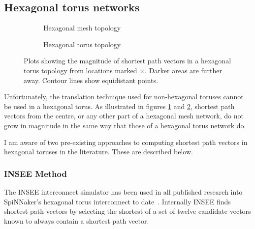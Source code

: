 		\subsection{Hexagonal torus networks}
			
			\begin{figure}
				\center
				
				\begin{subfigure}{\linewidth}
					\center
					\caption{Hexagonal mesh topology}
					\label{fig:distance-map-hex-mesh}
				\end{subfigure}
				
				\vspace{1em}
				
				\begin{subfigure}{\linewidth}
					\center
					\caption{Hexagonal torus topology}
					\label{fig:distance-map-hex-torus}
				\end{subfigure}
				
				\caption[Magnitudes of shortest path vectors in a hexagonal torus.]%
				{Plots showing the magnitude of shortest path vectors in a hexagonal
				torus topology from locations marked {\color{red}$\times$}.  Darker
				areas are further away. Contour lines show equidistant points.}
				
				\label{fig:distance-map-hex}
			\end{figure}
			
			Unfortunately, the translation technique used for non-hexagonal toruses
			cannot be used in a hexagonal torus. As illustrated in figures
			\ref{fig:distance-map-hex-mesh} and \ref{fig:distance-map-hex-torus},
			shortest path vectors from the centre, or any other part of a hexagonal
			mesh network, do not grow in magnitude in the same way that those of a
			hexagonal torus network do.
			
			I am aware of two pre-existing approaches to computing shortest path
			vectors in hexagonal toruses in the literature. These are described
			below.
			
			\subsubsection{INSEE Method}
			
				The INSEE interconnect simulator has been used in all published
				research into SpiNNaker's hexagonal torus interconnect to
				date~\cite{navaridas09,ghasempour15}. Internally INSEE finds shortest
				path vectors by selecting the shortest of a set of twelve candidate
				vectors known to always contain a shortest path vector.
				
